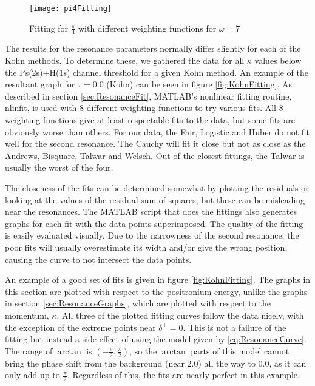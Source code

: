 \documentclass[Dissertation.tex]{subfiles}
\begin{document}
\begin{figure}[H]
	\centering
	\texttt{[image: pi4Fitting]}
	\caption{Fitting for $\frac{\pi}{4}$ with different weighting functions for $\omega = 7$}
	\label{fig:pi4Fitting}
\end{figure}

The results for the resonance parameters normally differ slightly for each of the Kohn methods.  To determine these, we gathered the data for all $\kappa$ values below the Ps(2s)+H(1s) channel threshold for a given Kohn method.  An example of the resultant graph for $\tau = 0.0$ (Kohn) can be seen in figure \ref{fig:KohnFitting}.  As described in section \ref{sec:ResonanceFit}, MATLAB's nonlinear fitting routine, nlinfit, is used with 8 different weighting functions to try various fits.  All 8 weighting functions give at least respectable fits to the data, but some fits are obviously worse than others.  For our data, the Fair, Logistic and Huber do not fit well for the second resonance.  The Cauchy will fit it close but not as close as the Andrews, Bisquare, Talwar and Welsch.  Out of the closest fittings, the Talwar is usually the worst of the four.

The closeness of the fits can be determined somewhat by plotting the residuals or looking at the values of the residual sum of squares, but these can be misleading near the resonances.  The MATLAB script that does the fittings also generates graphs for each fit with the data points superimposed.  The quality of the fitting is easily evaluated visually.  Due to the narrowness of the second resonance, the poor fits will usually overestimate its width and/or give the wrong position, causing the curve to not intersect the data points.

An example of a good set of fits is given in figure \ref{fig:KohnFitting}.  The graphs in this section are plotted with respect to the positronium energy, unlike the graphs in section \ref{sec:ResonanceGraphs}, which are plotted with respect to the momentum, $\kappa$.  All three of the plotted fitting curves follow the data nicely, with the exception of the extreme points near $\delta^+ = 0$.  This is not a failure of the fitting but instead a side effect of using the model given by \ref{eq:ResonanceCurve}.  The range of $\arctan$ is $(-\frac{\pi}{2},\frac{\pi}{2})$, so the $\arctan$ parts of this model cannot bring the phase shift from the background (near 2.0) all the way to 0.0, as it can only add up to $\frac{\pi}{2}$.  Regardless of this, the fits are nearly perfect in this example.
\end{document}

